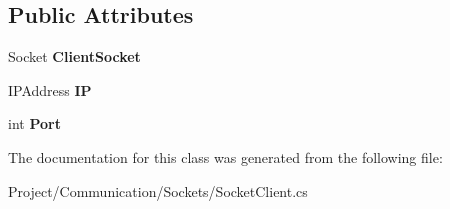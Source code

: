 \subsection*{Public Attributes}
\begin{DoxyCompactItemize}
\item 
\mbox{\label{class_lerp2_a_p_i_1_1_communication_1_1_sockets_1_1_socket_client_a26a1105d78296f8e171ca0a393f699ae}} 
Socket {\bfseries Client\+Socket}
\item 
\mbox{\label{class_lerp2_a_p_i_1_1_communication_1_1_sockets_1_1_socket_client_a588ac7c903b57397a5c7d7b28a510c44}} 
I\+P\+Address {\bfseries IP}
\item 
\mbox{\label{class_lerp2_a_p_i_1_1_communication_1_1_sockets_1_1_socket_client_a590a0834d3c7869dfa6661a4eb6c2e9b}} 
int {\bfseries Port}
\end{DoxyCompactItemize}


The documentation for this class was generated from the following file\+:\begin{DoxyCompactItemize}
\item 
Project/\+Communication/\+Sockets/Socket\+Client.\+cs\end{DoxyCompactItemize}
